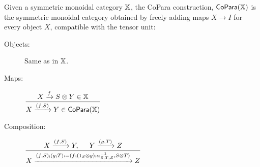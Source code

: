 \begin{definition}
Given a symmetric monoidal category $\mathbb{X}$, the CoPara construction, ${\sf CoPara}(\mathbb{X})$ is the symmetric monoidal category obtained by freely adding maps $X\to I$ for every object $X$, compatible with the tensor unit:
\begin{description}
\item[Objects:] Same as in $\mathbb{X}$.
\item[Maps:]  
\hfil $
\dfrac{ X\xrightarrow{f}  S\otimes Y \in \mathbb{X}           }
         { X\xrightarrow{(f,S)} Y \in  {\sf CoPara}(\mathbb{X}) }
$
\item[Composition:]
\hfil $
\dfrac{
	X\xrightarrow{(f,S)} Y , \hspace*{.5cm} Y\xrightarrow{(g,T)} Z }
         {X\xrightarrow{
		(f,S);(g;T) := (f;(1_S \otimes g);\alpha^{-1}_{S,T,Z} ,S\otimes T)}Z} 
$



\end{description}
\end{definition}

